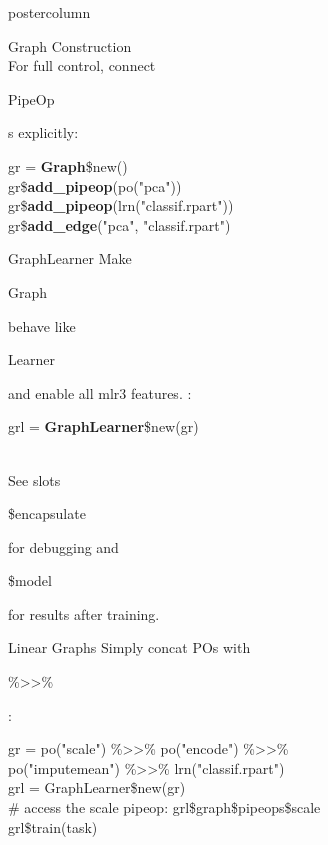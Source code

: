 \documentclass{beamer}
\newcommand{\codeinline}[1]{\begin{codeboxinline}#1\end{codeboxinline}}
\begin{document}
\begin{frame}[fragile]{}
\begin{columns}
\begin{column}{.245\textwidth}
\begin{beamercolorbox}[center]{postercolumn}
\begin{minipage}{.98\textwidth}
{\begin{myblock}{Graph Construction}
              \ \\
              For full control, connect \codeinline{PipeOp}s explicitly:
              \begin{codeboxmultiline}[width=23cm]
                gr = \textbf{Graph}\$new()\\
                gr\$\textbf{add\_pipeop}(po("pca"))\\
                gr\$\textbf{add\_pipeop}(lrn("classif.rpart"))\\
                gr\$\textbf{add\_edge}("pca", "classif.rpart")
              \end{codeboxmultiline}
            \end{myblock}
            \vspace{-0.5em}
            \begin{myblock}{GraphLearner}
              \vspace{-0.5em}
              Make \codeinline{Graph} behave like \codeinline{Learner} and enable all mlr3 features.
              : \codeinline{grl = \textbf{GraphLearner}\$new(gr)}\\
              See slots \codeinline{\$encapsulate} for debugging and \codeinline{\$model} for results after training. 
						\end{myblock}
            \begin{myblock}{Linear Graphs}
              \vspace{-0.5em}
              Simply concat POs with \codeinline{\%>{}>\%}:
              \begin{codeboxexample}
                {\footnotesize
                  gr = po("scale") \%>{}>\% po("encode") \%>{}>\%\\
                  \hspace*{1ex} po("imputemean") \%>{}>\% lrn("classif.rpart")\\
                  grl = GraphLearner\$new(gr)\\
                  \# access the scale pipeop:
                  grl\$graph\$pipeops\$scale\\
                  grl\$train(task)\\
}
\end{codeboxexample}
\end{myblock}}
\end{minipage}
\end{beamercolorbox}
\end{column}
\end{columns}
\end{frame}
\end{document}
